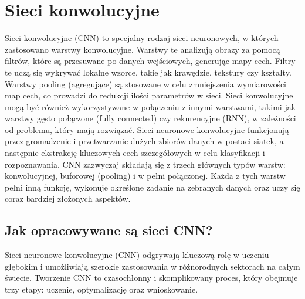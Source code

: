 \section{Sieci konwolucyjne}
Sieci konwolucyjne (CNN) to specjalny rodzaj sieci neuronowych, w których zastosowano warstwy konwolucyjne. Warstwy te analizują obrazy za pomocą filtrów, które są przesuwane po danych wejściowych, generując mapy cech. Filtry te uczą się wykrywać lokalne wzorce, takie jak krawędzie, tekstury czy kształty. Warstwy pooling (agregujące) są stosowane w celu zmniejszenia wymiarowości map cech, co prowadzi do redukcji ilości parametrów w sieci. Sieci konwolucyjne mogą być również wykorzystywane w połączeniu z innymi warstwami, takimi jak warstwy gęsto połączone (fully connected) czy rekurencyjne (RNN), w zależności od problemu, który mają rozwiązać. Sieci neuronowe konwolucyjne funkcjonują przez gromadzenie i przetwarzanie dużych zbiorów danych w postaci siatek, a następnie ekstrakcję kluczowych cech szczegółowych w celu klasyfikacji i rozpoznawania. CNN zazwyczaj składają się z trzech głównych typów warstw: konwolucyjnej, buforowej (pooling) i w pełni połączonej. Każda z tych warstw pełni inną funkcję, wykonuje określone zadanie na zebranych danych oraz uczy się coraz bardziej złożonych aspektów.

\subsection{Jak opracowywane są sieci CNN?}
Sieci neuronowe konwolucyjne (CNN) odgrywają kluczową rolę w uczeniu głębokim i umożliwiają szerokie zastosowania w różnorodnych sektorach na całym świecie. Tworzenie CNN to czasochłonny i skomplikowany proces, który obejmuje trzy etapy: uczenie, optymalizację oraz wnioskowanie.
